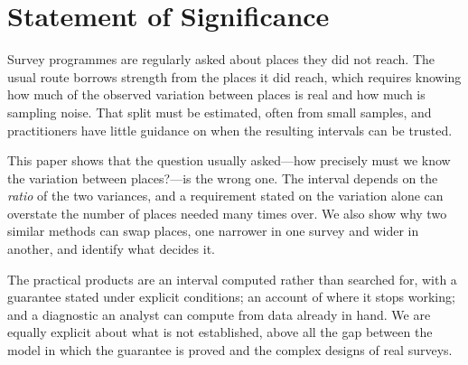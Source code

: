 \section*{Statement of Significance}

Survey programmes are regularly asked about places they did not reach. The
usual route borrows strength from the places it did reach, which requires knowing
how much of the observed variation between places is real and how much is
sampling noise. That split must be estimated, often from small samples, and
practitioners have little guidance on when the resulting intervals can be
trusted.

This paper shows that the question usually asked---how precisely must we know the
variation between places?---is the wrong one. The interval depends on the
\emph{ratio} of the two variances, and a requirement stated on the variation
alone can overstate the number of places needed many times over. We also show why
two similar methods can swap places, one narrower in one survey and wider in
another, and identify what decides it.

The practical products are an interval computed rather than searched for, with a
guarantee stated under explicit conditions; an account of where it stops working;
and a diagnostic an analyst can compute from data already in hand. We are equally
explicit about what is not established, above all the gap between the model in
which the guarantee is proved and the complex designs of real surveys.
